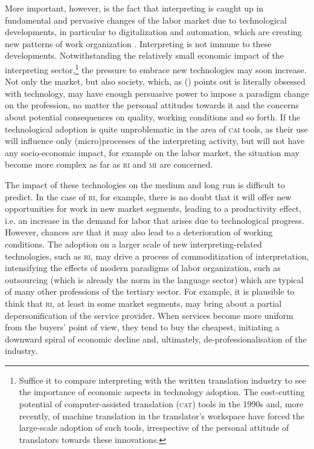 \documentclass[output=paper]{langsci/langscibook}
\begin{document}
More important, however, is the fact that interpreting is caught up in fundamental and pervasive changes of the labor market due to technological developments, in particular to digitalization and automation, which are creating new patterns of work organization \citep{ursula_huws_logged_2016,neufeind_work_2018}. Interpreting is not immune to these developments. Notwithstanding the relatively small economic impact of the interpreting sector,\footnote{Suffice it to compare interpreting with the written translation industry to see the importance of economic aspects in technology adoption. The cost-cutting potential of computer-assisted translation (\textsc{cat}) tools in the 1990s and, more recently, of machine translation in the translator’s workspace have forced the large-scale adoption of such tools, irrespective of the personal attitude of translators towards these innovations.} the pressure to embrace new technologies may soon increase. Not only the market, but also society, which, as \citeauthor{besnier_homme_2012} (\citeyear{besnier_homme_2012}) points out is literally obsessed with technology, may have enough persuasive power to impose a paradigm change on the profession, no matter the personal attitudes towards it and the concerns about potential consequences on quality, working conditions and so forth. If the technological adoption is quite unproblematic in the area of \textsc{cai} tools, as their use will influence only (micro)processes of the interpreting activity, but will not have any socio-economic impact, for example on the labor market, the situation may become more complex as far as \textsc{ri} and \textsc{mi} are concerned. 

The impact of these technologies on the medium and long run is difficult to predict. In the case of \textsc{ri}, for example, there is no doubt that it will offer new opportunities for work in new market segments, leading to a productivity effect, i.e. an increase in the demand for labor that arises due to technological progress. However, chances are that it may also lead to a deterioration of working conditions. The adoption on a larger scale of new interpreting-related technologies, such as \textsc{ri}, may drive a process of commoditization of interpretation, intensifying the effects of modern paradigms of labor organization, such as outsourcing (which is already the norm in the language sector) which are typical of many other professions of the tertiary sector. For example, it is plausible to think that \textsc{ri}, at least in some market segments, may bring about a partial depersonification of the service provider. When services become more uniform from the buyers’ point of view, they tend to buy the cheapest, initiating a downward spiral of economic decline and, ultimately, de-professionalisation of the industry. 
 
\end{document}
